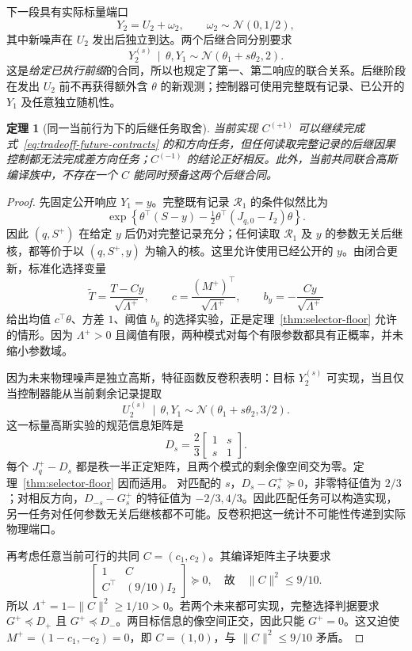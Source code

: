 \documentclass[UTF8,fontset=fandol,11pt,a4paper]{ctexart}
\newcommand{\N}{\mathcal N}
\newcommand{\given}{\,\mid\,}
\newtheorem{theorem}{定理}[section]
\theoremstyle{definition}
\theoremstyle{remark}
\numberwithin{equation}{section}
\begin{document}
下一段具有实际标量端口
\begin{equation}
 Y_2=U_2+\omega_2,\qquad \omega_2\sim\N(0,1/2),
 \label{eq:tradeoff-readout}
\end{equation}
其中新噪声在 $U_2$ 发出后独立到达。两个后继合同分别要求
\begin{equation}
 Y_2^{(s)}\given\theta,Y_1\sim\N(\theta_1+s\theta_2,2).
 \label{eq:tradeoff-future-contracts}
\end{equation}
这是\emph{给定已执行前缀}的合同，所以也规定了第一、第二响应的联合关系。后继阶段在发出 $U_2$ 前不再获得额外含 $\theta$ 的新观测；控制器可使用完整既有记录、已公开的 $Y_1$ 及任意独立随机性。

\begin{theorem}[同一当前行为下的后继任务取舍]
\label{thm:incompatible-futures}
当前实现 $C^{(+1)}$ 可以继续完成式~\eqref{eq:tradeoff-future-contracts} 的和方向任务，但任何读取完整记录的后继因果控制都无法完成差方向任务；$C^{(-1)}$ 的结论正好相反。此外，当前共同联合高斯编译族中，不存在一个 $C$ 能同时预备这两个后继合同。
\end{theorem}

\begin{proof}
先固定公开响应 $Y_1=y$。完整既有记录 $\mathcal R_1$ 的条件似然比为
\[
 \exp\!\left\{\theta^\top(S-y)-\tfrac12\theta^\top(J_{q,0}-I_2)\theta\right\}.
\]
因此 $(q,S^+)$ 在给定 $y$ 后仍对完整记录充分；任何读取 $\mathcal R_1$ 及 $y$ 的参数无关后继核，都等价于以 $(q,S^+,y)$ 为输入的核。这里允许使用已经公开的 $y$。由闭合更新，标准化选择变量
\[
 \widetilde T=\frac{T-Cy}{\sqrt{\Lambda^+}},\qquad
 c=\frac{(M^+)^\top}{\sqrt{\Lambda^+}},\qquad
 b_y=-\frac{Cy}{\sqrt{\Lambda^+}}
\]
给出均值 $c^\top\theta$、方差 $1$、阈值 $b_y$ 的选择实验，正是定理~\ref{thm:selector-floor} 允许的情形。因为 $\Lambda^+>0$ 且阈值有限，两种模式对每个有限参数都具有正概率，并未缩小参数域。

因为未来物理噪声是独立高斯，特征函数反卷积表明：目标 $Y_2^{(s)}$ 可实现，当且仅当控制器能从当前剩余记录提取
\[
 U_2^{(s)}\given\theta,Y_1\sim\N(\theta_1+s\theta_2,3/2).
\]
这一标量高斯实验的规范信息矩阵是
\begin{equation}
 D_s=\frac23\begin{bmatrix}1&s\\s&1\end{bmatrix}.
 \label{eq:tradeoff-D}
\end{equation}
每个 $J_q^+-D_s$ 都是秩一半正定矩阵，且两个模式的剩余像空间交为零。定理~\ref{thm:selector-floor} 因而适用。
对匹配的 $s$，$D_s-G_s^+\succeq0$，非零特征值为 $2/3$；对相反方向，$D_{-s}-G_s^+$ 的特征值为 $-2/3,4/3$。因此匹配任务可以构造实现，另一任务对任何参数无关后继核都不可能。反卷积把这一统计不可能性传递到实际物理端口。

再考虑任意当前可行的共同 $C=(c_1,c_2)$。其编译矩阵主子块要求
\[
 \begin{bmatrix}1&C\\C^\top&(9/10)I_2\end{bmatrix}\succeq0,
 \quad\text{故}\quad\|C\|^2\le9/10.
\]
所以 $\Lambda^+=1-\|C\|^2\ge1/10>0$。若两个未来都可实现，完整选择判据要求 $G^+\preceq D_+$ 且 $G^+\preceq D_-$。两目标信息的像空间正交，因此只能 $G^+=0$。这又迫使 $M^+=(1-c_1,-c_2)=0$，即 $C=(1,0)$，与 $\|C\|^2\le9/10$ 矛盾。
\end{proof}
\end{document}
